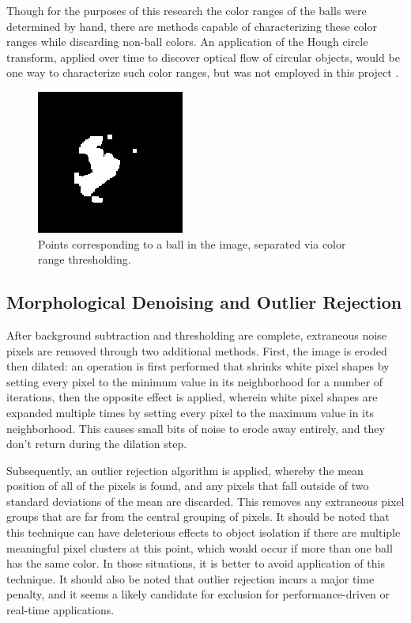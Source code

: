 \documentclass[letterpaper, 10 pt, conference]{ieeeconf}  %
\begin{document}
Though for the purposes of this research the color ranges of the balls were determined by hand, there are methods capable of characterizing these color ranges while discarding non-ball colors. An application of the Hough circle transform, applied over time to discover optical flow of circular objects, would be one way to characterize such color ranges, but was not employed in this project \cite{hough}.

\begin{figure}
\centering
    \includegraphics{threshold.png}
    \caption{Points corresponding to a ball in the image, separated via color range thresholding.}
    \label{fig:threshold}
\end{figure}

\subsection{Morphological Denoising and Outlier Rejection}

After background subtraction and thresholding are complete, extraneous noise pixels are removed through two additional methods. First, the image is eroded then dilated: an operation is first performed that shrinks white pixel shapes by setting every pixel to the minimum value in its neighborhood for a number of iterations, then the opposite effect is applied, wherein white pixel shapes are expanded multiple times by setting every pixel to the maximum value in its neighborhood. This causes small bits of noise to erode away entirely, and they don't return during the dilation step.

Subsequently, an outlier rejection algorithm is applied, whereby the mean position of all of the pixels is found, and any pixels that fall outside of two standard deviations of the mean are discarded. This removes any extraneous pixel groups that are far from the central grouping of pixels. It should be noted that this technique can have deleterious effects to object isolation if there are multiple meaningful pixel clusters at this point, which would occur if more than one ball has the same color. In those situations, it is better to avoid application of this technique. It should also be noted that outlier rejection incurs a major time penalty, and it seems a likely candidate for exclusion for performance-driven or real-time applications.
\end{document}
